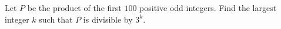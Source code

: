 Let \(P\) be the product of the first \(100\) positive odd integers. Find the largest integer \(k\) such that \(P\) is divisible by \(3^k\).
